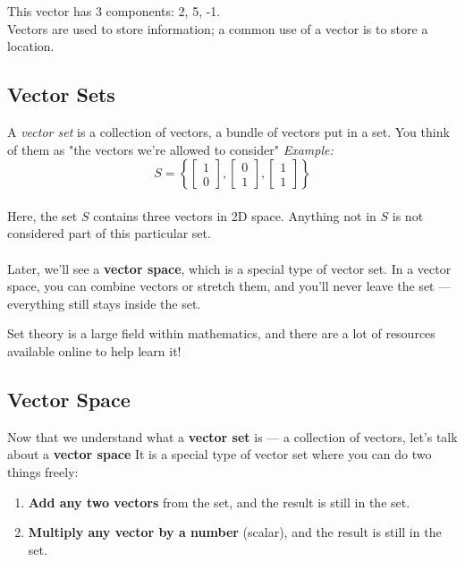 \documentclass[12pt]{report}
\begin{document}
        This vector has 3 components: 2, 5, -1. \\
        Vectors are used to store information; a common use of a vector is to store a location.

        \subsection{Vector Sets}
            A \emph{vector set} is a collection of vectors, a bundle of vectors put in a set. You think of them as "the vectors we're allowed to consider"
            \emph{Example:} 
            \begin{equation}
                S = \left\{ 
                    \begin{bmatrix}1\\0\end{bmatrix}, 
                    \begin{bmatrix}0\\1\end{bmatrix}, 
                    \begin{bmatrix}1\\1\end{bmatrix} 
                    \right\}
            \end{equation}
            \\
            Here, the set $S$ contains three vectors in 2D space. Anything not in $S$ is not considered part of this particular set. 
            \\\\
            Later, we'll see a \textbf{vector space}, which is a special type of vector set. In a vector space, you can combine vectors or stretch them, and you’ll never leave the set — everything still stays inside the set.

            Set theory is a large field within mathematics, and there are a lot of resources available online to help learn it!

        \subsection{Vector Space}
            Now that we understand what a \textbf{vector set} is — a collection of vectors, let's talk about a \textbf{vector space} It is a special type of vector set where you can do two things freely:

            \begin{enumerate}
                \item \textbf{Add any two vectors} from the set, and the result is still in the set.
                \item \textbf{Multiply any vector by a number} (scalar), and the result is still in the set.
            \end{enumerate}
\end{document}
